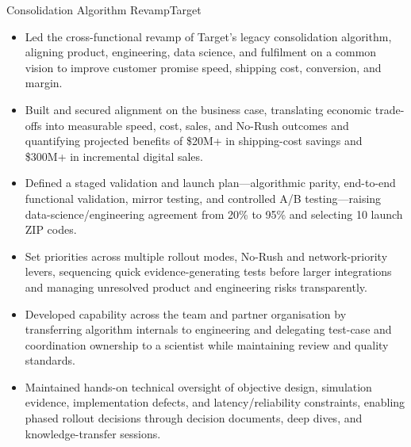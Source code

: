 \documentclass[11pt,a4paper]{moderncv}
\begin{document}
    {Consolidation Algorithm Revamp}{Target}{}{}{
    \begin{itemize}
        \item Led the cross-functional revamp of Target's legacy consolidation algorithm, aligning product, engineering, data science, and fulfilment on a common vision to improve customer promise speed, shipping cost, conversion, and margin.
        \item Built and secured alignment on the business case, translating economic trade-offs into measurable speed, cost, sales, and No-Rush outcomes and quantifying projected benefits of \$20M+ in shipping-cost savings and \$300M+ in incremental digital sales.
        \item Defined a staged validation and launch plan---algorithmic parity, end-to-end functional validation, mirror testing, and controlled A/B testing---raising data-science/engineering agreement from 20\% to 95\% and selecting 10 launch ZIP codes.
        \item Set priorities across multiple rollout modes, No-Rush and network-priority levers, sequencing quick evidence-generating tests before larger integrations and managing unresolved product and engineering risks transparently.
        \item Developed capability across the team and partner organisation by transferring algorithm internals to engineering and delegating test-case and coordination ownership to a scientist while maintaining review and quality standards.
        \item Maintained hands-on technical oversight of objective design, simulation evidence, implementation defects, and latency/reliability constraints, enabling phased rollout decisions through decision documents, deep dives, and knowledge-transfer sessions.
    \end{itemize}
    }
\end{document}
